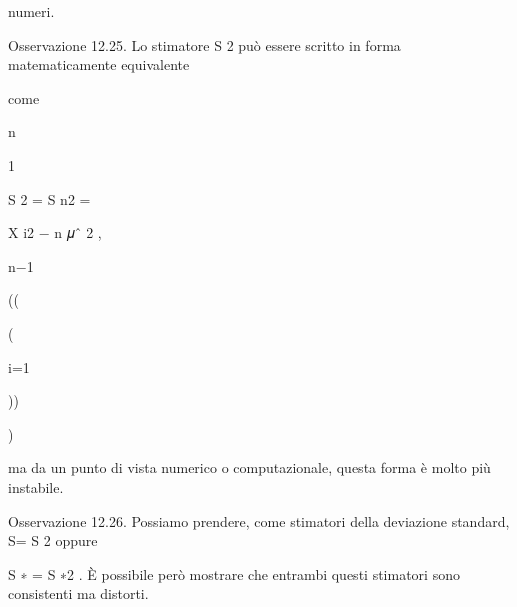 \documentclass[a4paper,portrait,12pt]{article}
\begin{document}
\begin{flushleft}
numeri.
\end{flushleft}


\begin{flushleft}
Osservazione 12.25. Lo stimatore S 2 pu\`{o} essere scritto in forma matematicamente equivalente
\end{flushleft}


\begin{flushleft}
come
\end{flushleft}


\begin{flushleft}
n
\end{flushleft}


1


\begin{flushleft}
S 2 = S n2 =
\end{flushleft}


\begin{flushleft}
X i2 $-$ n 𝜇ˆ 2 ,
\end{flushleft}


\begin{flushleft}
n$-$1
\end{flushleft}





((


(





\begin{flushleft}
i=1
\end{flushleft}





))


)





\begin{flushleft}
ma da un punto di vista numerico o computazionale, questa forma \`{e} molto più instabile.
\end{flushleft}


\begin{flushleft}
Osservazione 12.26. Possiamo prendere, come stimatori della deviazione standard, S= S 2 oppure
\end{flushleft}


\begin{flushleft}
S ∗ = S ∗2 . \`{E} possibile per\`{o} mostrare che entrambi questi stimatori sono consistenti ma distorti.
\end{flushleft}
\end{document}

